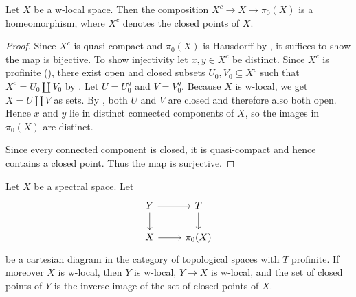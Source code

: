 \begin{lemma}
    \label{thm:closed-points-isom-pi0}
    Let \(X\) be a w-local space. Then the composition $X^c \to X \to \pi_0(X)$ is a homeomorphism,
    where $X^c$ denotes the closed points of $X$.
    \leanok
\end{lemma}

\begin{proof}
    \leanok
    Since $X^c$ is quasi-compact and $\pi_0(X)$ is Hausdorff by , it suffices
    to show the map is bijective.
    To show injectivity let $x, y \in X^c$ be distinct. Since $X^c$ is profinite
    (), there
    exist open and closed subsets $U_0, V_0 \subseteq X^c$ such that
    $X^c = U_0 \coprod V_0$ by .
    Let $U = U_0^g$ and $V = V_0^g$. Because $X$ is w-local, we get
    $X = U \coprod V$ as sets. By ,
    both $U$ and $V$ are closed and therefore also both open. Hence
    $x$ and $y$ lie in distinct connected components of $X$, so the images in $\pi_0(X)$ are distinct.

    Since every connected component is closed, it is quasi-compact and hence contains a closed point. Thus
    the map is surjective.
\end{proof}

\begin{lemma}
\label{thm:cartesian-profinite-w-local}
\leanok
Let $X$ be a spectral space. Let
\[
\begin{tikzcd}
Y \arrow[r] \arrow[d] & T \arrow[d] \\
X \arrow[r] & \pi_0(X)
\end{tikzcd}
\]
be a cartesian diagram in the category of topological spaces with $T$ profinite. If moreover $X$ is w-local, then $Y$ is w-local, $Y \to X$ is w-local, and the set of closed points of $Y$ is the inverse image of the set of closed points of $X$.
\end{lemma}

